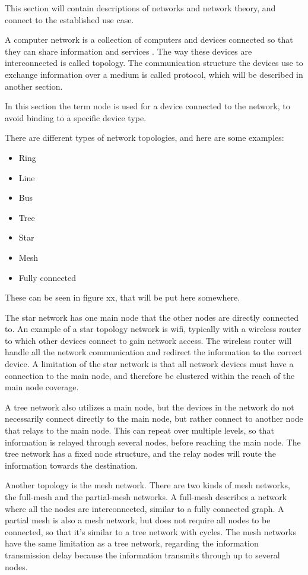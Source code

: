 This section will contain descriptions of networks and network theory, and connect to the established use case.

A computer network is a collection of computers and devices connected so that they can share information and services \cite{mansfield2009computer}. The way these devices are interconnected is called topology. The communication structure the devices use to exchange information over a medium is called protocol, which will be described in another section.

In this section the term node is used for a device connected to the network, to avoid binding to a specific device type.

There are different types of network topologies, and here are some examples:
\begin{itemize}
	\item Ring
	\item Line
	\item Bus
	\item Tree
	\item Star
	\item Mesh
	\item Fully connected
\end{itemize}

These can be seen in figure xx, that will be put here somewhere. %

The star network has one main node that the other nodes are directly connected to. An example of a star topology network is wifi, typically with a wireless router to which other devices connect to gain network access. The wireless router will handle all the network communication and redirect the information to the correct device. A limitation of the star network is that all network devices must have a connection to the main node, and therefore be clustered within the reach of the main node coverage. 

A tree network also utilizes a main node, but the devices in the network do not necessarily connect directly to the main node, but rather connect to another node that relays to the main node. This can repeat over multiple levels, so that information is relayed through several nodes, before reaching the main node. The tree network has a fixed node structure, and the relay nodes will route the information towards the destination. 

Another topology is the mesh network. There are two kinds of mesh networks, the full-mesh and the partial-mesh networks. A full-mesh describes a network where all the nodes are interconnected, similar to a fully connected graph. A partial mesh is also a mesh network, but does not require all nodes to be connected, so that it's similar to a tree network with cycles. The mesh networks have the same limitation as a tree network, regarding the information transmission delay because the information transmits through up to several nodes. 

